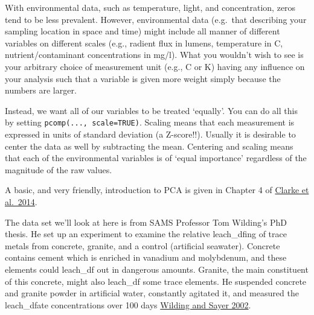 \documentclass[
  11pt,
  a4paper,
]{book}
\begin{document}
With environmental data, such as temperature, light, and concentration, zeros tend to be less prevalent. However, environmental data (e.g.~that describing your sampling location in space and time) might include all manner of different variables on different scales (e.g., radient flux in lumens, temperature in C, nutrient/contaminant concentrations in mg/l). What you wouldn't wish to see is your arbitrary choice of measurement unit (e.g., C or K) having any influence on your analysis such that a variable is given more weight simply because the numbers are larger.

Instead, we want all of our variables to be treated `equally'. You can do all this by setting \texttt{pcomp(...,\ scale=TRUE)}. Scaling means that each measurement is expressed in units of standard deviation (a Z-score!!). Usually it is desirable to center the data as well by subtracting the mean. Centering and scaling means that each of the environmental variables is of `equal importance' regardless of the magnitude of the raw values.

A basic, and very friendly, introduction to PCA is given in Chapter 4 of \href{https://www.primer-e.com/wp-content/uploads/2018/10/Change-in-Marine-Communities-3rd-ed.pdf}{Clarke et al.~2014}.

The data set we'll look at here is from SAMS Professor Tom Wilding's PhD thesis. He set up an experiment to examine the relative leach\_dfing of trace metals from concrete, granite, and a control (artificial seawater). Concrete contains cement which is enriched in vanadium and molybdenum, and these elements could leach\_df out in dangerous amounts. Granite, the main constituent of this concrete, might also leach\_df some trace elements. He suspended concrete and granite powder in artificial water, constantly agitated it, and measured the leach\_dfate concentrations over 100 days \href{https://doi.org/10.1006/jmsc.2002.1267}{Wilding and Sayer 2002}.
\end{document}
